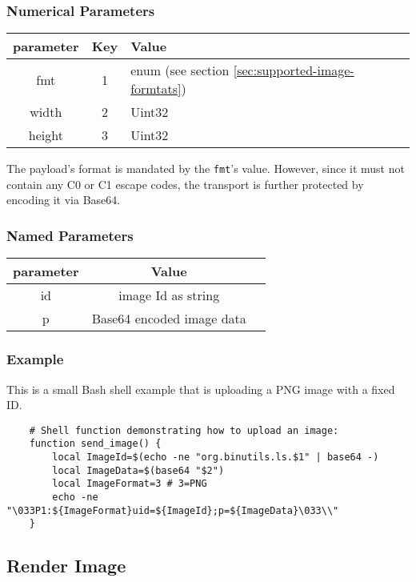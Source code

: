 \documentclass{article}
\newcommand{\code}[1]{\colorbox{light-gray}{\texttt{#1}}}
\begin{document}
\subsubsection*{Numerical Parameters}

\begin{tabular}{ |c|c|l| }
    \hline
    \textbf{parameter}   & \textbf{Key} & \textbf{Value} \\
    \hline
    fmt         & 1   & enum (see section \ref{sec:supported-image-formtats}) \\
    width       & 2   & Uint32 \\
    height      & 3   & Uint32 \\
    \hline
\end{tabular}

The payload's format is mandated by the \code{fmt}'s value. However, since it must not contain
any C0 or C1 escape codes, the transport is further protected by encoding it via Base64.

\subsubsection*{Named Parameters}

\begin{tabular}{ |c|c|l| }
    \hline
    \textbf{parameter}   & \textbf{Value} \\
    \hline
    id          & image Id as string \\
    p           & Base64 encoded image data \\
    \hline
\end{tabular}

\subsubsection*{Example}

This is a small Bash shell example that is uploading a PNG image with a fixed ID.

\begin{verbatim}
    # Shell function demonstrating how to upload an image:
    function send_image() {
        local ImageId=$(echo -ne "org.binutils.ls.$1" | base64 -)
        local ImageData=$(base64 "$2")
        local ImageFormat=3 # 3=PNG
        echo -ne "\033P1:${ImageFormat}uid=${ImageId};p=${ImageData}\033\\"
    }
\end{verbatim}

\subsection{Render Image}
\end{document}
